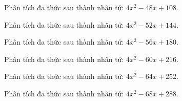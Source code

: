 \begin{bt}
	Phân tích đa thức sau thành nhân tử: $4 x^2 - 48 x + 108$.
\end{bt}
\begin{bt}
	Phân tích đa thức sau thành nhân tử: $4 x^2 - 52 x + 144$.
\end{bt}
\begin{bt}
	Phân tích đa thức sau thành nhân tử: $4 x^2 - 56 x + 180$.
\end{bt}
\begin{bt}
	Phân tích đa thức sau thành nhân tử: $4 x^2 - 60 x + 216$.
\end{bt}
\begin{bt}
	Phân tích đa thức sau thành nhân tử: $4 x^2 - 64 x + 252$.
\end{bt}
\begin{bt}
	Phân tích đa thức sau thành nhân tử: $4 x^2 - 68 x + 288$.
\end{bt}